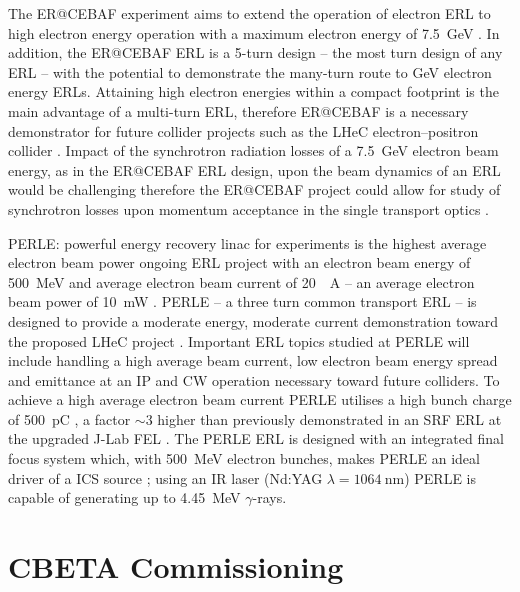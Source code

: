 \documentclass[../main.tex]{subfiles}
\begin{document}
The ER@CEBAF experiment aims to extend the operation of electron ERL to high electron energy operation with a maximum electron energy of 7.5~\si{\giga\electronvolt} \cite{bogacz2016er,meot2016er}. In addition, the ER@CEBAF ERL is a 5-turn design -- the most turn design of any ERL -- with the potential to demonstrate the many-turn route to \si{\giga\electronvolt} electron energy ERLs. Attaining high electron energies within a compact footprint is the main advantage of a multi-turn ERL, therefore ER@CEBAF is a necessary demonstrator for future collider projects such as the LHeC electron--positron collider \cite{valloni2013strawman,bruning2019exploring,holzer2021accelerator}. Impact of the synchrotron radiation losses of a 7.5~\si{\giga\electronvolt} electron beam energy, as in the ER@CEBAF ERL design, upon the beam dynamics of an ERL would be challenging therefore the ER@CEBAF project could allow for study of synchrotron losses upon momentum acceptance in the single transport optics \cite{adolphsen2022european}.  

PERLE: powerful energy recovery linac for experiments is the highest average electron beam power ongoing ERL project with an electron beam energy of 500~\si{\mega\electronvolt} and average electron beam current of 20~\si{\mill\ampere} -- an average electron beam power of 10~\si{\milli\watt} \cite{angal2018perle,bogacz2021perle}. PERLE -- a three turn common transport ERL -- is designed to provide a moderate energy, moderate current demonstration toward the proposed LHeC project \cite{valloni2013strawman,bruning2019exploring,holzer2021accelerator}. Important ERL topics studied at PERLE will include handling a high average beam current, low electron beam energy spread and emittance at an IP and CW operation \cite{adolphsen2022european} necessary toward future colliders. To achieve a high average electron beam current PERLE utilises a high bunch charge of 500~\si{\pico\coulomb} \cite{}, a factor $\sim3$ higher than previously demonstrated in an SRF ERL at the upgraded J-Lab FEL \cite{neil2006jlab}. The PERLE ERL is designed with an integrated final focus system which, with 500~\si{\mega\electronvolt} electron bunches, makes PERLE an ideal driver of a ICS source \cite{adolphsen2022european}; using an IR laser (Nd:YAG $\lambda=1064~\si{\nano\meter}$) PERLE is capable of generating up to 4.45~\si{\mega\electronvolt} $\gamma$-rays.      

\section{CBETA Commissioning}
\label{sec:CBETA_commissioning}
\end{document}
